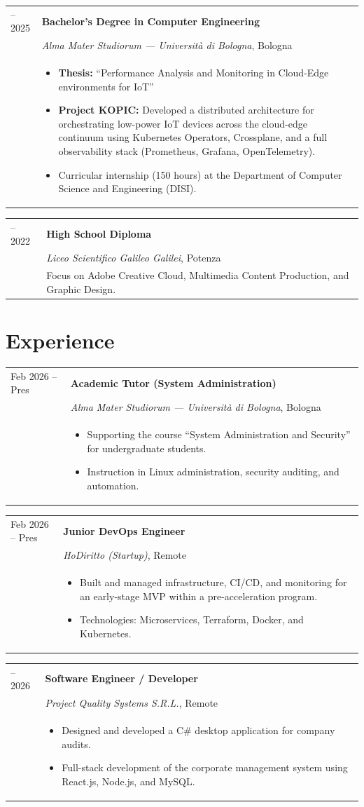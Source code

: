 \documentclass[11pt,a4paper]{article}
\makeatletter
\newcommand{\cventry}[6]{
    \noindent
    \begin{tabularx}{\textwidth}{@{}p{3.5cm} X@{}}
        {\small\sffamily #1} & \textbf{#2} \\
        & \textit{#3}, #4 \\
        & \small #6
    \end{tabularx}
    \vspace{6pt}
}
\makeatother
\begin{document}
\cventry{2022 -- 2025}{Bachelor's Degree in Computer Engineering}{Alma Mater Studiorum --- Università di Bologna}{Bologna}{Grade: 107/110}{
\begin{itemize}[noitemsep, topsep=0pt, leftmargin=1em]
    \item \textbf{Thesis:} ``Performance Analysis and Monitoring in Cloud-Edge environments for IoT''
    \item \textbf{Project KOPIC:} Developed a distributed architecture for orchestrating low-power IoT devices across the cloud-edge continuum using Kubernetes Operators, Crossplane, and a full observability stack (Prometheus, Grafana, OpenTelemetry).
    \item Curricular internship (150 hours) at the Department of Computer Science and Engineering (DISI).
\end{itemize}}

\cventry{2017 -- 2022}{High School Diploma}{Liceo Scientifico Galileo Galilei}{Potenza}{}{Focus on Adobe Creative Cloud, Multimedia Content Production, and Graphic Design.}

\section{Experience}
\cventry{Feb 2026 -- Pres}{Academic Tutor (System Administration)}{Alma Mater Studiorum --- Università di Bologna}{Bologna}{}{
\begin{itemize}[noitemsep, topsep=0pt, leftmargin=1em]
    \item Supporting the course ``System Administration and Security'' for undergraduate students.
    \item Instruction in Linux administration, security auditing, and automation.
\end{itemize}}

\cventry{Feb 2026 -- Pres}{Junior DevOps Engineer}{HoDiritto (Startup)}{Remote}{}{
\begin{itemize}[noitemsep, topsep=0pt, leftmargin=1em]
    \item Built and managed infrastructure, CI/CD, and monitoring for an early-stage MVP within a pre-acceleration program.
    \item Technologies: Microservices, Terraform, Docker, and Kubernetes.
\end{itemize}}

\cventry{2023 -- 2026}{Software Engineer / Developer}{Project Quality Systems S.R.L.}{Remote}{}{
\begin{itemize}[noitemsep, topsep=0pt, leftmargin=1em]
    \item Designed and developed a C\# desktop application for company audits.
    \item Full-stack development of the corporate management system using React.js, Node.js, and MySQL.
\end{itemize}}
\end{document}
